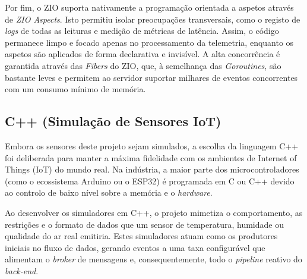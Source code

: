 Por fim, o ZIO suporta nativamente a programação orientada a aspetos através de \textit{ZIO Aspects}. Isto permitiu isolar preocupações transversais, como o registo de \textit{logs} de todas as leituras e medição de métricas de latência. Assim, o código permanece limpo e focado apenas no processamento da telemetria, enquanto os aspetos são aplicados de forma declarativa e invisível. A alta concorrência é garantida através das \textit{Fibers} do ZIO, que, à semelhança das \textit{Goroutines}, são bastante leves e permitem ao servidor suportar milhares de eventos concorrentes com um consumo mínimo de memória.

\subsection{C++ (Simulação de Sensores IoT)}
Embora os sensores deste projeto sejam simulados, a escolha da linguagem C++ foi deliberada para manter a máxima fidelidade com os ambientes de Internet of Things (IoT) do mundo real. Na indústria, a maior parte dos microcontroladores (como o ecossistema Arduino ou o ESP32) é programada em C ou C++ devido ao controlo de baixo nível sobre a memória e o \textit{hardware}. 

Ao desenvolver os simuladores em C++, o projeto mimetiza o comportamento, as restrições e o formato de dados que um sensor de temperatura, humidade ou qualidade do ar real emitiria. Estes simuladores atuam como os produtores iniciais no fluxo de dados, gerando eventos a uma taxa configurável que alimentam o \textit{broker} de mensagens e, consequentemente, todo o \textit{pipeline} reativo do \textit{back-end}.
